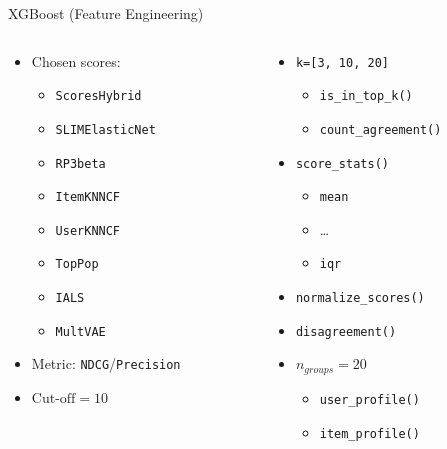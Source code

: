 \documentclass{beamer}
\begin{document}
\begin{frame}{XGBoost (Feature Engineering)}
  \begin{columns}[t]
    \begin{column}{0.5\textwidth}
      \begin{itemize}
        \item Chosen scores:
        \begin{itemize}
          \item \texttt{ScoresHybrid}
          \item \texttt{SLIMElasticNet}
          \item \texttt{RP3beta}
          \item \texttt{ItemKNNCF}
          \item \texttt{UserKNNCF}
          \item \texttt{TopPop}
          \item \texttt{IALS}
          \item \texttt{MultVAE}
        \end{itemize}
        \item Metric: \texttt{NDCG}\slash\texttt{Precision}
        \item $\text{Cut-off}=10$
      \end{itemize}
    \end{column}

    \begin{column}{0.5\textwidth}
      \begin{itemize}
        \item \lstinline{k=[3, 10, 20]}
        \begin{itemize}
          \item \texttt{is\_in\_top\_k()}
          \item \texttt{count\_agreement()}
        \end{itemize}
        \item \texttt{score\_stats()}
        \begin{itemize}
          \item \texttt{mean}
          \item \ldots
          \item \texttt{iqr}
        \end{itemize}
        \item \texttt{normalize\_scores()}
        \item \texttt{disagreement()}
        \item $n_{groups}=20$
        \begin{itemize}
          \item \texttt{user\_profile()}
          \item \texttt{item\_profile()}
        \end{itemize}
      \end{itemize}
    \end{column}
  \end{columns}
\end{frame}
\end{document}
